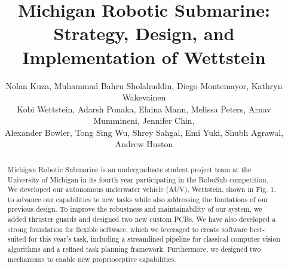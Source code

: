\documentclass[conference]{IEEEtran}
\begin{document}
\title{Michigan Robotic Submarine: Strategy, Design, and Implementation of Wettstein}
\author{
Nolan Kuza, Muhammad Bahru Sholahuddin, Diego Montemayor, Kathryn Wakevainen \\
Kobi Wettstein, Adarsh Ponaka, Elaina Mann, Melissa Peters, Arnav Mummineni, Jennifer Chin, \\ Alexander Bowler, Tong Sing Wu, Shrey Sahgal, Emi Yuki, Shubh Agrawal, Andrew Huston \\
}

\maketitle
\pagestyle{fancy}
\rhead{\thepage}

\begin{abstract}
Michigan Robotic Submarine is an undergraduate student project team at the University of Michigan in its fourth year participating in the RoboSub competition. We developed our autonomous underwater vehicle (AUV), Wettstein, shown in Fig. 1, to advance our capabilities to new tasks while also addressing the limitations of our previous design. To improve the robustness and maintainability of our system, we added thruster guards and designed two new custom PCBs. We have also developed a strong foundation for flexible software, which we leveraged to create software best-suited for this year's task, including a streamlined pipeline for classical computer vision algorithms and a refined task planning framework. Furthermore, we designed two mechanisms to enable new proprioceptive capabilities.


\end{abstract}
\end{document}

